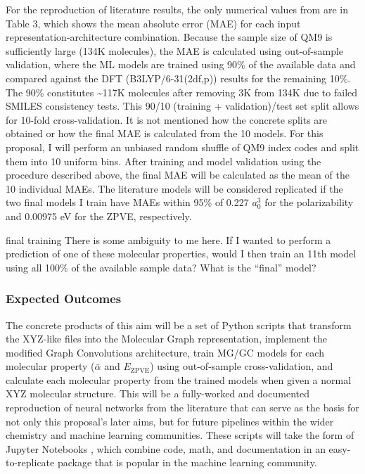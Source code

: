 \documentclass[12pt]{article}
\begin{document}
For the reproduction of literature results, the only numerical values from \parencite{2017arXiv170205532F} are in Table 3, which shows the mean absolute error (MAE) for each input representation-architecture combination. Because the sample size of QM9 is sufficiently large (134K molecules), the MAE is calculated using out-of-sample validation, where the ML models are trained using 90\% of the available data and compared against the DFT (B3LYP/6-31(2df,p)) results for the remaining 10\%. The 90\% constitutes \textasciitilde{}117K molecules after removing 3K from 134K due to failed SMILES consistency tests. This 90/10 (training + validation)/test set split allows for 10-fold cross-validation. It is not mentioned how the concrete splits are obtained or how the final MAE is calculated from the 10 models. For this proposal, I will perform an unbiased random shuffle of QM9 index codes and split them into 10 uniform bins. After training and model validation using the procedure described above, the final MAE will be calculated as the mean of the 10 individual MAEs.  The literature models will be considered replicated if the two final models I train have MAEs within 95\% of 0.227 \(a_{0}^{3}\) for the polarizability and 0.00975 eV for the ZPVE, respectively. 

\begin{anfxnote}{final training}
There is some ambiguity to me here. If I wanted to perform a prediction of one of these molecular properties, would I then train an 11th model using all 100\% of the available sample data? What is the ``final'' model?
\end{anfxnote}

\subsubsection{Expected Outcomes}
\label{sec:orgb4ab2b3}

The concrete products of this aim will be a set of Python scripts that transform the XYZ-like files into the Molecular Graph representation, implement the modified Graph Convolutions architecture, train MG/GC models for each molecular property (\(\bar{\alpha}\) and \(E_\text{ZPVE}\)) using out-of-sample cross-validation, and calculate each molecular property from the trained models when given a normal XYZ molecular structure. This will be a fully-worked and documented reproduction of neural networks from the literature that can serve as the basis for not only this proposal's later aims, but for future pipelines within the wider chemistry and machine learning communities. These scripts will take the form of Jupyter Notebooks \cite{jupyter,PER-GRA:2007}, which combine code, math, and documentation in an easy-to-replicate package that is popular in the machine learning community.
\end{document}
